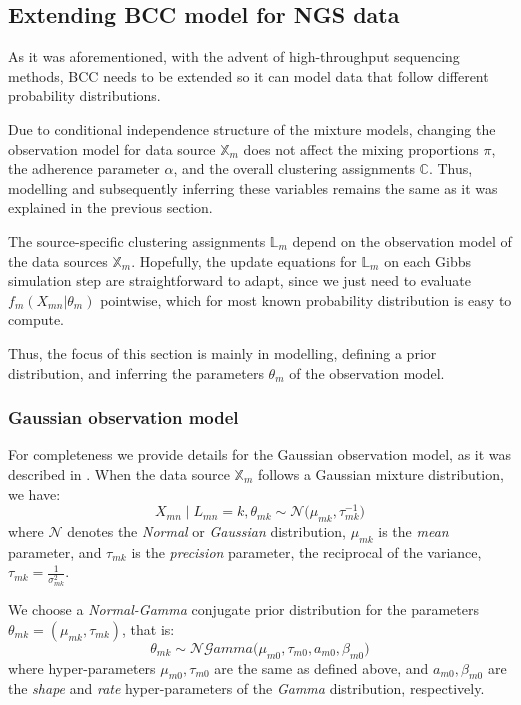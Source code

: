 \subsection{Extending BCC model for NGS data}\label{integr-extension-subsect}
As it was aforementioned, with the advent of high-throughput sequencing methods, BCC needs to be extended so it can model data that follow different probability distributions.

Due to conditional independence structure of the mixture models, changing the observation model for data source $\mathbb{X}_{m}$ does not affect the mixing proportions $\pi$, the adherence parameter $\alpha$, and the overall clustering assignments $\mathbb{C}$. Thus, modelling and subsequently inferring these variables remains the same as it was explained in the previous section.

The source-specific clustering assignments $\mathbb{L}_{m}$ depend on the observation model of the data sources $\mathbb{X}_{m}$. Hopefully, the update equations for $\mathbb{L}_{m}$ on each Gibbs simulation step are straightforward to adapt, since we just need to evaluate $f_{m}(X_{mn}|\theta_{m})$ pointwise, which for most known probability distribution is easy to compute.

Thus, the focus of this section is mainly in modelling, \ie defining a prior distribution, and inferring the parameters $\theta_{m}$ of the observation model. 

\subsubsection*{Gaussian observation model}
For completeness we provide details for the Gaussian observation model, as it was described in \citet{Lock2013}. When the data source $\mathbb{X}_{m}$ follows a Gaussian mixture distribution, we have:
\begin{equation}
	X_{mn} \mid L_{mn} = k, \theta_{mk} \sim \mathcal{N}\big(\mu_{mk}, \tau_{mk}^{-1}\big)
\end{equation}
where $\mathcal{N}$ denotes the \emph{Normal} or \emph{Gaussian} distribution, $\mu_{mk}$ is the \emph{mean} parameter, and $\tau_{mk}$ is the \emph{precision} parameter, \ie the reciprocal of the variance, $\tau_{mk} = \frac{1}{\sigma_{mk}^{2}}$.

We choose a \emph{Normal-Gamma} conjugate prior distribution for the parameters $\theta_{mk} = (\mu_{mk}, \tau_{mk})$, that is:
\begin{equation}
	\theta_{mk} \sim \mathcal{NG}amma\big(\mu_{m0}, \tau_{m0}, \mathit{a}_{m0}, \beta_{m0}\big)
\end{equation}
where hyper-parameters $\mu_{m0}, \tau_{m0}$ are the same as defined above, and $\mathit{a}_{m0}, \beta_{m0}$ are the \emph{shape} and \emph{rate} hyper-parameters of the \emph{Gamma} distribution, respectively.

